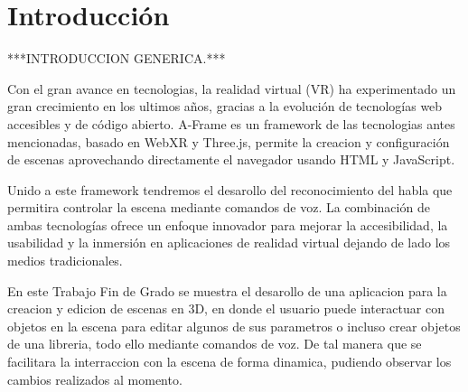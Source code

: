 \documentclass[a4paper, 12pt]{book}
\let\cleardoublepage\clearpage
\begin{document}

\tableofcontents 
\cleardoublepage
\listoffigures %



\cleardoublepage
\chapter{Introducción}
\label{sec:intro} %
***INTRODUCCION GENERICA.***

Con el gran avance en tecnologias, la realidad virtual (VR) ha experimentado un gran crecimiento en los ultimos años, gracias a la evolución de tecnologías web accesibles y de código abierto. A-Frame es un framework de las tecnologias antes mencionadas, basado en WebXR y Three.js, permite la creacion y configuración de escenas aprovechando directamente el navegador usando HTML y JavaScript.

Unido a este framework tendremos el desarollo del reconocimiento del habla que permitira controlar la escena mediante comandos de voz.  La combinación de ambas tecnologías ofrece un enfoque innovador para mejorar la accesibilidad, la usabilidad y la inmersión en aplicaciones de realidad virtual dejando de lado los medios tradicionales.

En este Trabajo Fin de Grado se muestra el desarollo de una aplicacion para la creacion y edicion de escenas en 3D, en donde el usuario puede interactuar con objetos en la escena para editar algunos de sus parametros o incluso crear objetos de una libreria, todo ello mediante comandos de voz. De tal manera que se facilitara la interraccion con la escena de forma dinamica, pudiendo observar los cambios realizados al momento.
\end{document}
